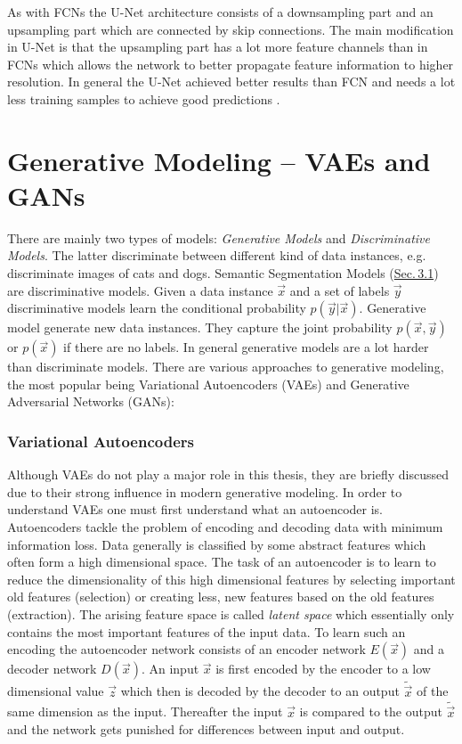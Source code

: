 As with FCNs the U-Net architecture consists of a downsampling part and an upsampling part which are connected by skip connections. The main modification in U-Net is that the upsampling part has a lot more feature channels than in FCNs which allows the network to better propagate feature information to higher resolution. In general the U-Net achieved better results than FCN and needs a lot less training samples to achieve good predictions \cite{unet}.

\section[Generative Modeling – VAEs and GANs]{Generative Modeling – VAEs and GANs%
    }
There are mainly two types of models: \textit{Generative Models} and \textit{Discriminative Models}. The latter discriminate between different kind of data instances, e.g. discriminate images of cats and dogs. Semantic Segmentation Models (\hyperref[sec:3.1]{Sec.\,3.1}) are discriminative models. Given a data instance $\vec{x}$ and a set of labels $\vec{y}$ discriminative models learn the conditional probability $p(\vec{y}|\vec{x})$. Generative model generate new data instances. They capture the joint probability $p(\vec{x},\vec{y})$ or $p(\vec{x})$ if there are no labels. In general generative models are a lot harder than discriminate models. There are various approaches to generative modeling, the most popular being Variational Autoencoders (VAEs) and Generative Adversarial Networks (GANs):

\subsubsection{Variational Autoencoders}
Although VAEs \cite{vae_original} do not play a major role in this thesis, they are briefly discussed due to their strong influence in modern generative modeling. In order to understand VAEs one must first understand what an autoencoder is. Autoencoders tackle the problem of encoding and decoding data with minimum information loss. Data generally is classified by some abstract features which often form a high dimensional space. The task of an autoencoder is to learn to reduce the dimensionality of this high dimensional features by selecting important old features (selection) or creating less, new features based on the old features (extraction). The arising feature space is called \textit{latent space} which essentially only contains the most important features of the input data. To learn such an encoding the autoencoder network consists of an encoder network $E(\vec{x})$ and a decoder network $D(\vec{x})$. An input $\vec{x}$ is first encoded by the encoder to a low dimensional value $\vec{z}$ which then is decoded by the decoder to an output $\tilde{\vec{x}}$ of the same dimension as the input. Thereafter the input $\vec{x}$ is compared to the output $\tilde{\vec{x}}$ and the network gets punished for differences between input and output.

